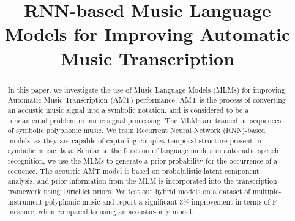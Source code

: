 \documentclass{article}
\title{RNN-based Music Language Models for Improving Automatic Music Transcription}
\begin{document}
%
\maketitle
%
\begin{abstract}
In this paper, we investigate the use of Music Language Models (MLMs) for improving Automatic Music Transcription (AMT) performance. AMT is the process of converting an acoustic music signal into a symbolic notation, and is considered to be a fundamental problem in music signal processing. The MLMs are trained on sequences of symbolic polyphonic music. We train Recurrent Neural Network (RNN)-based models, as they are capable of capturing complex temporal structure present in symbolic music data. Similar to the function of language models in automatic speech recognition, we use the MLMs to generate a prior probability for the occurrence of a sequence. The acoustic AMT model is based on probabilistic latent component analysis, and prior information from the MLM is incorporated into the transcription framework using Dirichlet priors. We test our hybrid models on a dataset of multiple-instrument polyphonic music and report a significant 3\% improvement in terms of F-measure, when compared to using an acoustic-only model.
\end{abstract}
%
















%
\end{document}
